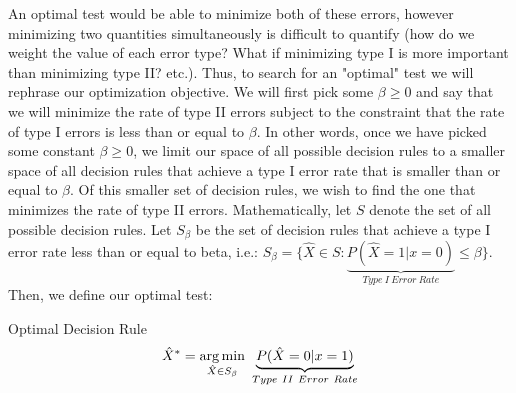 An optimal test would be able to minimize both of these errors, however minimizing two quantities simultaneously is difficult to quantify (how do we weight the value of each error type? What if minimizing type I is more important than minimizing type II? etc.). Thus, to search for an "optimal" test we will rephrase our optimization objective. We will first pick some \(\beta \geq 0\) and say that we will minimize the rate of type II errors subject to the constraint that the rate of type I errors is less than or equal to \(\beta\). In other words, once we have picked some constant \(\beta \geq 0\), we limit our space of all possible decision rules to a smaller space of all decision rules that achieve a type I error rate that is smaller than or equal to \(\beta\). Of this smaller set of decision rules, we wish to find the one that minimizes the rate of type II errors. Mathematically, let \(S\) denote the set of all possible decision rules. Let \(S_\beta\) be the set of decision rules that achieve a type I error rate less than or equal to beta, i.e.: \(S_\beta = \{\hat{X} \in S : \underbrace{P(\hat{X} = 1 |x=0)}_{Type\ I\ Error\ Rate} \leq \beta\}\). Then, we define our optimal test:
\begin{defn}{Optimal Decision Rule}{}
\begin{equation*}
  \hat{X}^* = \underset{\hat{X}\in S_\beta}{\argmin}\ \underbrace{P(\hat{X} = 0 |x=1)}_{Type\ II\ Error\ Rate}
\end{equation*}

\end{defn}


 






